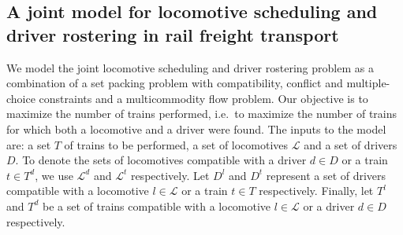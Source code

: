 \subsection{A joint model for locomotive scheduling and driver rostering in rail freight transport}

We model the joint locomotive scheduling and driver rostering problem as a combination of a set packing problem with compatibility, conflict and multiple-choice constraints and a multicommodity flow problem.
Our objective is to maximize the number of trains performed, i.e.\ to maximize the number of trains for which both a locomotive and a driver were found. The inputs to the model are: a set $T$ of trains to be performed, a set of locomotives $\mathscr{L}$ and a set of drivers $D$. To denote the sets of locomotives compatible with a driver $d \in D$ or a train $t \in T^d$, we use $\mathscr{L}^d$ and $\mathscr{L}^t$ respectively. Let $D^l$ and $D^t$  represent a set of drivers compatible with a locomotive $l \in \mathscr{L}$ or a train $t \in T$ respectively. Finally, let $T^l$ and $T^d$ be a set of trains compatible with a locomotive $l \in \mathscr{L}$ or a driver $d \in D$ respectively.

